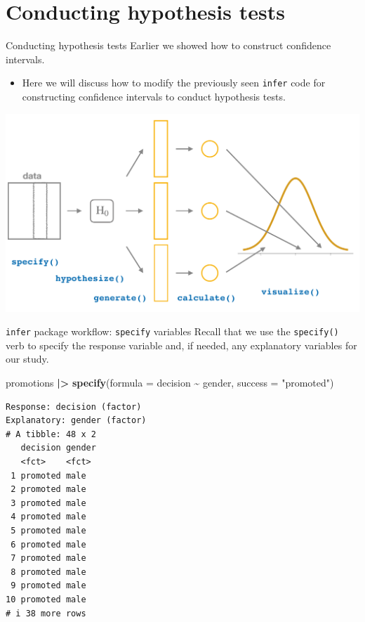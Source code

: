 \documentclass[
  ignorenonframetext,
]{beamer}
\newenvironment{Shaded}{\begin{snugshade}}{\end{snugshade}}
\newcommand{\AttributeTok}[1]{\textcolor[rgb]{0.13,0.29,0.53}{#1}}
\newcommand{\FunctionTok}[1]{\textcolor[rgb]{0.13,0.29,0.53}{\textbf{#1}}}
\newcommand{\NormalTok}[1]{#1}
\newcommand{\SpecialCharTok}[1]{\textcolor[rgb]{0.81,0.36,0.00}{\textbf{#1}}}
\newcommand{\StringTok}[1]{\textcolor[rgb]{0.31,0.60,0.02}{#1}}
\providecommand{\tightlist}{%
  \setlength{\itemsep}{0pt}\setlength{\parskip}{0pt}}
\begin{document}
\hypertarget{conducting-hypothesis-tests}{%
\section{Conducting hypothesis
tests}\label{conducting-hypothesis-tests}}

\begin{frame}[fragile]{Conducting hypothesis tests}
\protect\hypertarget{conducting-hypothesis-tests-1}{}
Earlier we showed how to construct confidence intervals.

\begin{itemize}
\tightlist
\item
  Here we will discuss how to modify the previously seen \texttt{infer}
  code for constructing confidence intervals to conduct hypothesis
  tests.
\end{itemize}

\begin{center}\includegraphics[width=0.7\linewidth,height=0.5\textheight]{week12_7} \end{center}
\end{frame}

\begin{frame}[fragile]{\texttt{infer} package workflow: \texttt{specify}
variables}
\protect\hypertarget{infer-package-workflow-specify-variables}{}
Recall that we use the \texttt{specify()} verb to specify the response
variable and, if needed, any explanatory variables for our study.

\tiny

\begin{Shaded}
\begin{Highlighting}[]
\NormalTok{promotions }\SpecialCharTok{|\textgreater{}} 
  \FunctionTok{specify}\NormalTok{(}\AttributeTok{formula =}\NormalTok{ decision }\SpecialCharTok{\textasciitilde{}}\NormalTok{ gender, }\AttributeTok{success =} \StringTok{"promoted"}\NormalTok{)}
\end{Highlighting}
\end{Shaded}

\begin{verbatim}
Response: decision (factor)
Explanatory: gender (factor)
# A tibble: 48 x 2
   decision gender
   <fct>    <fct> 
 1 promoted male  
 2 promoted male  
 3 promoted male  
 4 promoted male  
 5 promoted male  
 6 promoted male  
 7 promoted male  
 8 promoted male  
 9 promoted male  
10 promoted male  
# i 38 more rows
\end{verbatim}

\normalsize
\end{frame}
\end{document}
